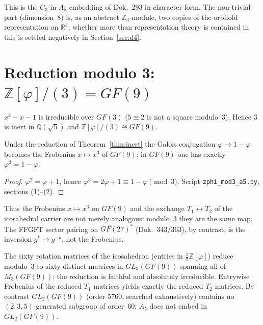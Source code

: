 This is the $C_3$-in-$A_5$ embedding of Dok.~293 in character form. The
non-trivial part (dimension~8) is, as an abstract $\mathbb{Z}_3$-module,
two copies of the orbifold representation on $\mathbb{R}^4$; whether more
than representation theory is contained in this is settled negatively in
Section~\ref{sec:d4}.

\section[{Reduction modulo 3: Z[phi]/(3) = GF(9)}]{Reduction modulo 3: $\mathbb{Z}[\varphi]/(3)=GF(9)$}

\begin{theorem}\label{thm:inert}
$x^2-x-1$ is irreducible over $GF(3)$ ($5\equiv2$ is not a square
modulo~3). Hence $3$ is inert in $\mathbb{Q}(\sqrt5)$ and
$\mathbb{Z}[\varphi]/(3)\cong GF(9)$.
\end{theorem}

\begin{theorem}\label{thm:frob}
Under the reduction of Theorem~\ref{thm:inert} the Galois conjugation
$\varphi\mapsto1-\varphi$ becomes the Frobenius $x\mapsto x^3$ of $GF(9)$:
in $GF(9)$ one has exactly $\varphi^3=1-\varphi$.
\end{theorem}

\begin{proof}
$\varphi^2=\varphi+1$, hence $\varphi^3=2\varphi+1\equiv1-\varphi\pmod3$.
Script \texttt{zphi\_mod3\_a5.py}, sections (1)--(2).
\end{proof}

Thus the Frobenius $x\mapsto x^3$ on $GF(9)$ and the exchange
$T_1\leftrightarrow T_2$ of the icosahedral carrier are not merely analogous:
modulo~3 they are the same map. The FFGFT sector pairing on $GF(27)^*$
(Dok.~343/363), by contrast, is the inversion $g^k\mapsto g^{-k}$, not the Frobenius.

\begin{theorem}[$A_5$ over $GF(9)$, \EM/\BM]\label{thm:a5gf9}
The sixty rotation matrices of the icosahedron (entries in
$\tfrac12\mathbb{Z}[\varphi]$) reduce modulo~3 to sixty distinct matrices in
$GL_3(GF(9))$ spanning all of $M_3(GF(9))$: the reduction is faithful and
absolutely irreducible. Entrywise Frobenius of the reduced $T_1$ matrices
yields exactly the reduced $T_2$ matrices. By contrast $GL_2(GF(9))$
(order 5760, searched exhaustively) contains no $(2,3,5)$-generated
subgroup of order~60: $A_5$ does not embed in $GL_2(GF(9))$.
\end{theorem}

